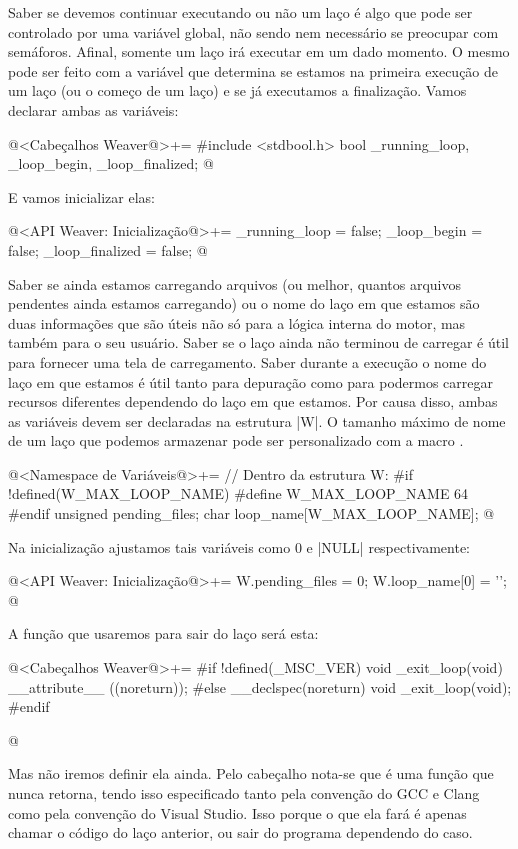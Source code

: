 Saber se devemos continuar executando ou não um laço é algo que pode
ser controlado por uma variável global, não sendo nem necessário se
preocupar com semáforos. Afinal, somente um laço irá executar em um
dado momento. O mesmo pode ser feito com a variável que determina se
estamos na primeira execução de um laço (ou o começo de um laço) e se
já executamos a finalização. Vamos declarar ambas as variáveis:

\iniciocodigo
@<Cabeçalhos Weaver@>+=
#include <stdbool.h>
bool _running_loop, _loop_begin, _loop_finalized;
@
\fimcodigo

E vamos inicializar elas:

\iniciocodigo
@<API Weaver: Inicialização@>+=
_running_loop = false;
_loop_begin = false;
_loop_finalized = false;
@
\fimcodigo

Saber se ainda estamos carregando arquivos (ou melhor, quantos
arquivos pendentes ainda estamos carregando) ou o nome do laço em que
estamos são duas informações que são úteis não só para a lógica
interna do motor, mas também para o seu usuário. Saber se o laço ainda
não terminou de carregar é útil para fornecer uma tela de
carregamento. Saber durante a execução o nome do laço em que estamos é
útil tanto para depuração como para podermos carregar recursos
diferentes dependendo do laço em que estamos. Por causa disso, ambas
as variáveis devem ser declaradas na estrutura |W|. O tamanho máximo
de nome de um laço que podemos armazenar pode ser personalizado com a
macro .

\iniciocodigo
@<Namespace de Variáveis@>+=
// Dentro da estrutura W:
#if !defined(W_MAX_LOOP_NAME)
#define W_MAX_LOOP_NAME 64
#endif
unsigned pending_files;
char loop_name[W_MAX_LOOP_NAME];
@
\fimcodigo

Na inicialização ajustamos tais variáveis como 0 e |NULL|
respectivamente:

\iniciocodigo
@<API Weaver: Inicialização@>+=
W.pending_files = 0;
W.loop_name[0] = '\0';
@
\fimcodigo

A função que usaremos para sair do laço será esta:

\iniciocodigo
@<Cabeçalhos Weaver@>+=
#if !defined(_MSC_VER)
void _exit_loop(void) __attribute__ ((noreturn));
#else
__declspec(noreturn) void _exit_loop(void);
#endif


@
\fimcodigo

Mas não iremos definir ela ainda. Pelo cabeçalho nota-se que é uma
função que nunca retorna, tendo isso especificado tanto pela convenção
do GCC e Clang como pela convenção do Visual Studio. Isso porque o que
ela fará é apenas chamar o código do laço anterior, ou sair do
programa dependendo do caso.

